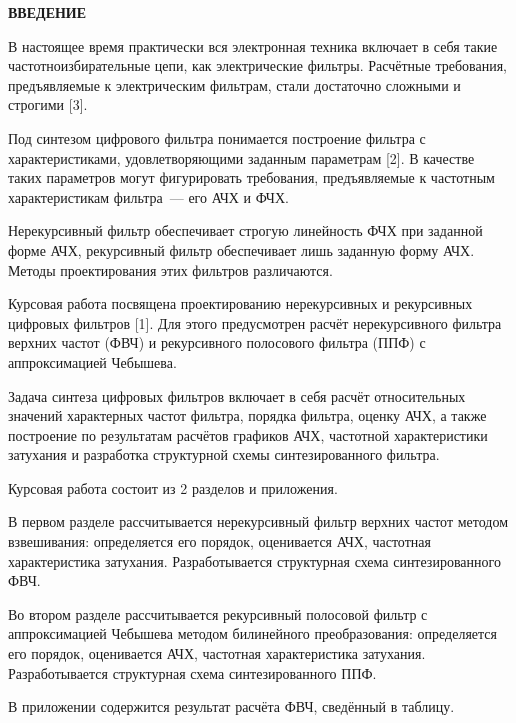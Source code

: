 \newpage

\begin{center}
  \Large{\textbf{ВВЕДЕНИЕ}}
\end{center}

В настоящее время практически вся электронная техника включает в себя
такие частотноизбирательные цепи, как электрические фильтры. Расчётные
требования, предъявляемые к электрическим фильтрам, стали достаточно
сложными и строгими [3].

Под синтезом цифрового фильтра понимается построение фильтра с
характеристиками, удовлетворяющими заданным параметрам [2]. В качестве
таких параметров могут фигурировать требования, предъявляемые к
частотным характеристикам фильтра~--- его АЧХ и ФЧХ.

Нерекурсивный фильтр обеспечивает строгую линейность ФЧХ при заданной
форме АЧХ, рекурсивный фильтр обеспечивает лишь заданную форму
АЧХ. Методы проектирования этих фильтров различаются.

Курсовая работа посвящена проектированию нерекурсивных и рекурсивных
цифровых фильтров [1]. Для этого предусмотрен расчёт нерекурсивного
фильтра верхних частот (ФВЧ) и рекурсивного полосового фильтра (ППФ) с
аппроксимацией Чебышева.

Задача синтеза цифровых фильтров включает в себя расчёт относительных
значений характерных частот фильтра, порядка фильтра, оценку АЧХ, а
также построение по результатам расчётов графиков АЧХ, частотной
характеристики затухания и разработка структурной схемы
синтезированного фильтра.

Курсовая работа состоит из 2 разделов и приложения.

В первом разделе рассчитывается нерекурсивный фильтр верхних частот
методом взвешивания: определяется его порядок, оценивается АЧХ,
частотная характеристика затухания. Разработывается структурная схема
синтезированного ФВЧ.

Во втором разделе рассчитывается рекурсивный полосовой фильтр с
аппроксимацией Чебышева методом билинейного преобразования:
определяется его порядок, оценивается АЧХ, частотная характеристика
затухания. Разработывается структурная схема синтезированного ППФ.

В приложении содержится результат расчёта ФВЧ, сведённый в таблицу.

\newpage


